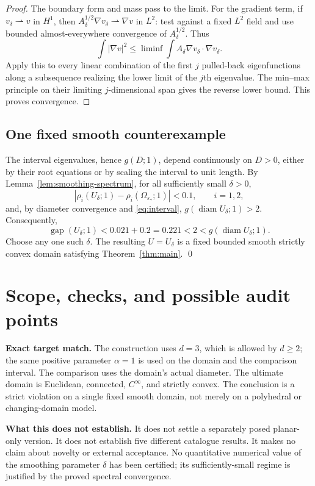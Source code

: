\documentclass[11pt,a4paper]{article}
\theoremstyle{remark}
\newcommand{\eps}{\varepsilon}
\newcommand{\gap}{\operatorname{gap}}
\newcommand{\diam}{\operatorname{diam}}
\begin{document}
\begin{proof}
The boundary form and mass pass to the limit. For the gradient term, if $v_\delta\rightharpoonup v$ in $H^1$, then
$A_\delta^{1/2}\nabla v_\delta\rightharpoonup\nabla v$ in $L^2$: test against a fixed $L^2$ field and use bounded almost-everywhere convergence of $A_\delta^{1/2}$. Thus
\[
 \int|\nabla v|^2\le\liminf\int A_\delta\nabla v_\delta\cdot\nabla v_\delta.
\]
Apply this to every linear combination of the first $j$ pulled-back eigenfunctions along a subsequence realizing the lower limit of the $j$th eigenvalue. The min--max principle on their limiting $j$-dimensional span gives the reverse lower bound. This proves convergence.
\end{proof}

\subsection{One fixed smooth counterexample}
The interval eigenvalues, hence $g(D;1)$, depend continuously on $D>0$, either by their root equations or by scaling the interval to unit length. By Lemma~\ref{lem:smoothing-spectrum}, for all sufficiently small $\delta>0$,
\[
 |\rho_i(U_\delta;1)-\rho_i(\Omega_{\eps_*};1)|<0.1,
 \qquad i=1,2,
\]
and, by diameter convergence and \eqref{eq:interval}, $g(\diam U_\delta;1)>2$. Consequently,
\[
 \gap(U_\delta;1)<0.021+0.2=0.221<2<g(\diam U_\delta;1).
\]
Choose any one such $\delta$. The resulting $U=U_\delta$ is a fixed bounded smooth strictly convex domain satisfying Theorem~\ref{thm:main}. \qed

\section{Scope, checks, and possible audit points}
\textbf{Exact target match.} The construction uses $d=3$, which is allowed by $d\ge2$; the same positive parameter $\alpha=1$ is used on the domain and the comparison interval. The comparison uses the domain's actual diameter. The ultimate domain is Euclidean, connected, $C^\infty$, and strictly convex. The conclusion is a strict violation on a single fixed smooth domain, not merely on a polyhedral or changing-domain model.

\textbf{What this does not establish.} It does not settle a separately posed planar-only version. It does not establish five different catalogue results. It makes no claim about novelty or external acceptance. No quantitative numerical value of the smoothing parameter $\delta$ has been certified; its sufficiently-small regime is justified by the proved spectral convergence.
\end{document}
